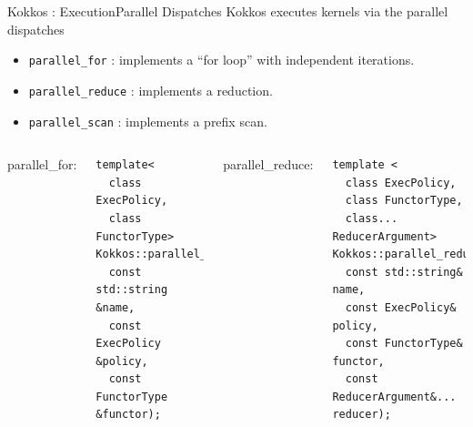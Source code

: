 \begin{frame}[fragile]{Kokkos : Execution}{Parallel Dispatches}
  Kokkos executes kernels via the parallel dispatches

  \begin{itemize}
    \item \verb|parallel_for| : implements a “for loop” with independent iterations.
    \item \verb|parallel_reduce| : implements a reduction.
    \item \verb|parallel_scan| : implements a prefix scan.
  \end{itemize}

  \begin{columns}
      parallel\_for:
      \begin{verbatim}
template<
  class ExecPolicy, 
  class FunctorType>
Kokkos::parallel_for(
  const std::string &name, 
  const ExecPolicy &policy, 
  const FunctorType &functor);
      \end{verbatim}
    parallel\_reduce:
    \begin{verbatim}
template <
  class ExecPolicy, 
  class FunctorType, 
  class... ReducerArgument>
Kokkos::parallel_reduce(
  const std::string& name,
  const ExecPolicy& policy,
  const FunctorType& functor,
  const ReducerArgument&... reducer);
    \end{verbatim}
  \end{columns}
\end{frame}

